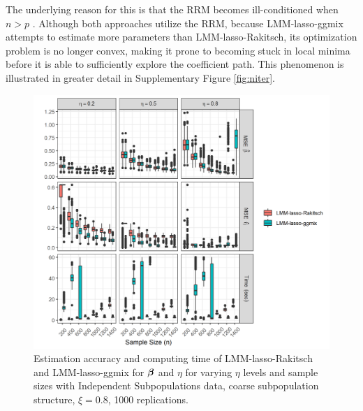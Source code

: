 The underlying reason for this is that the RRM becomes ill-conditioned when $n > p$ \citep{ledoit2004well}. Although both approaches utilize the RRM, because LMM-lasso-ggmix attempts to estimate more parameters than LMM-lasso-Rakitsch, its optimization problem is no longer convex, making it prone to becoming stuck in local minima before it is able to sufficiently explore the coefficient path. This phenomenon is illustrated in greater detail in Supplementary Figure \ref{fig:niter}.

\begin{figure}[H]
    \centering
    \includegraphics[width = \textwidth]{figures/eta_beta_hat.png}
     \caption{Estimation accuracy and computing time of LMM-lasso-Rakitsch and LMM-lasso-ggmix for $\boldsymbol{\beta}{}$ and $\eta$ for varying $\eta$ levels and sample sizes with Independent Subpopulations data, coarse subpopulation structure, $\xi = 0.8$, 1000 replications.}
    \label{fig:eta_beta_mse}
\end{figure}

\subsection{}


